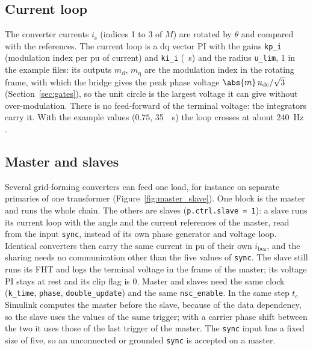 \documentclass[11pt,a4paper]{scrartcl}
\newcommand{\ped}[1]{_{\mathrm{#1}}}
\newcommand{\code}[1]{\texttt{#1}}
\begin{document}
\begin{onehalfspace}
\subsection{Current loop}
\label{sec:gfm_current_loop}

The converter currents $i\ped{s}$ (indices 1 to 3 of $M$) are rotated by $\theta$ and compared with the references. The current loop is a dq vector PI with the gains \code{kp\_i} (modulation index per pu of current) and \code{ki\_i} (\si{\per\second}) and the radius \code{u\_lim}, 1 in the example files: its outputs $m\ped{d}$, $m\ped{q}$ are the modulation index in the rotating frame, with which the bridge gives the peak phase voltage $\abs{m}\, u\ped{dc}/\sqrt{3}$ (Section~\ref{sec:gates}), so the unit circle is the largest voltage it can give without over-modulation. There is no feed-forward of the terminal voltage: the integrators carry it. With the example values ($0.75$, \SI{35}{\per\second}) the loop crosses at about \SI{240}{\hertz} \cite{gfm_note}.

\subsection{Master and slaves}
\label{sec:master_slave}

Several grid-forming converters can feed one load, for instance on separate primaries of one transformer (Figure~\ref{fig:master_slave}). One block is the master and runs the whole chain. The others are slaves (\code{p.ctrl.slave = 1}): a slave runs its current loop with the angle and the current references of the master, read from the input \code{sync}, instead of its own phase generator and voltage loop. Identical converters then carry the same current in pu of their own $i\ped{bez}$, and the sharing needs no communication other than the five values of \code{sync}. The slave still runs its FHT and logs the terminal voltage in the frame of the master; its voltage PI stays at rest and its clip flag is 0. Master and slaves need the same clock (\code{k\_time}, \code{phase}, \code{double\_update}) and the same \code{nsc\_enable}. In the same step $t\ped{c}$ Simulink computes the master before the slave, because of the data dependency, so the slave uses the values of the same trigger; with a carrier phase shift between the two it uses those of the last trigger of the master. The \code{sync} input has a fixed size of five, so an unconnected or grounded \code{sync} is accepted on a master.


\end{onehalfspace}
\end{document}

